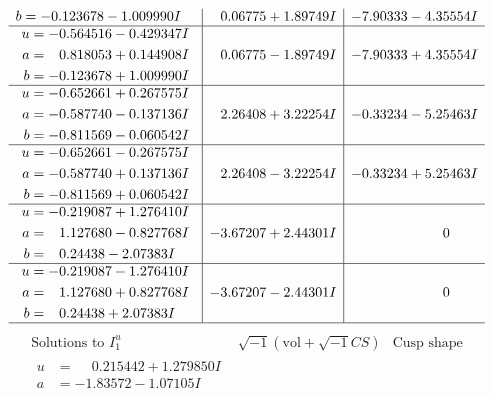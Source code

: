 \documentclass[1p]{elsarticle_modified}
\theoremstyle{definition}
\newcommand{\I}{\sqrt{-1}}
\begin{document}
$$\begin{array}{c|c|c}
\begin{aligned}
b &= -0.123678 - 1.009990 I\end{aligned}
 & \phantom{-}0.06775 + 1.89749 I & -7.90333 - 4.35554 I \\ \hline\begin{aligned}
u &= -0.564516 - 0.429347 I \\
a &= \phantom{-}0.818053 + 0.144908 I \\
b &= -0.123678 + 1.009990 I\end{aligned}
 & \phantom{-}0.06775 - 1.89749 I & -7.90333 + 4.35554 I \\ \hline\begin{aligned}
u &= -0.652661 + 0.267575 I \\
a &= -0.587740 - 0.137136 I \\
b &= -0.811569 - 0.060542 I\end{aligned}
 & \phantom{-}2.26408 + 3.22254 I & -0.33234 - 5.25463 I \\ \hline\begin{aligned}
u &= -0.652661 - 0.267575 I \\
a &= -0.587740 + 0.137136 I \\
b &= -0.811569 + 0.060542 I\end{aligned}
 & \phantom{-}2.26408 - 3.22254 I & -0.33234 + 5.25463 I \\ \hline\begin{aligned}
u &= -0.219087 + 1.276410 I \\
a &= \phantom{-}1.127680 - 0.827768 I \\
b &= \phantom{-}0.24438 - 2.07383 I\end{aligned}
 & -3.67207 + 2.44301 I & \phantom{-0.000000 } 0 \\ \hline\begin{aligned}
u &= -0.219087 - 1.276410 I \\
a &= \phantom{-}1.127680 + 0.827768 I \\
b &= \phantom{-}0.24438 + 2.07383 I\end{aligned}
 & -3.67207 - 2.44301 I & \phantom{-0.000000 } 0\\
 \hline 
 \end{array}$$\newpage$$\begin{array}{c|c|c}  
\text{Solutions to }I^u_{1}& \I (\text{vol} + \sqrt{-1}CS) & \text{Cusp shape}\\
 \hline 
\begin{aligned}
u &= \phantom{-}0.215442 + 1.279850 I \\
a &= -1.83572 - 1.07105 I \\

\end{aligned}
\end{array}$$
\end{document}
